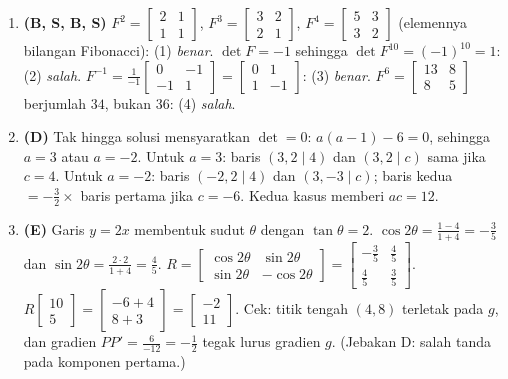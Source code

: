 \documentclass[a4paper,11pt]{article}
\newcommand{\sm}[1]{\left[\begin{smallmatrix}#1\end{smallmatrix}\right]}
\begin{document}
\begin{enumerate}[leftmargin=2em,itemsep=2pt,topsep=2pt]
\item[\textbf{10.}] \textbf{(B, S, B, S)} $F^2=\sm{2&1\\1&1}$, $F^3=\sm{3&2\\2&1}$, $F^4=\sm{5&3\\3&2}$ (elemennya bilangan Fibonacci): (1) \emph{benar}. $\det F=-1$ sehingga $\det F^{10}=(-1)^{10}=1$: (2) \emph{salah}. $F^{-1}=\frac{1}{-1}\sm{0&-1\\-1&1}=\sm{0&1\\1&-1}$: (3) \emph{benar}. $F^6=\sm{13&8\\8&5}$ berjumlah $34$, bukan $36$: (4) \emph{salah}.
\item[\textbf{11.}] \textbf{(D)} Tak hingga solusi mensyaratkan $\det=0$: $a(a-1)-6=0$, sehingga $a=3$ atau $a=-2$. Untuk $a=3$: baris $(3,2\mid4)$ dan $(3,2\mid c)$ sama jika $c=4$. Untuk $a=-2$: baris $(-2,2\mid4)$ dan $(3,-3\mid c)$; baris kedua $=-\tfrac32\times$ baris pertama jika $c=-6$. Kedua kasus memberi $ac=12$.
\item[\textbf{12.}] \textbf{(E)} Garis $y=2x$ membentuk sudut $\theta$ dengan $\tan\theta=2$. $\cos2\theta=\frac{1-4}{1+4}=-\frac35$ dan $\sin2\theta=\frac{2\cdot2}{1+4}=\frac45$. $R=\begin{bmatrix}\cos2\theta&\sin2\theta\\\sin2\theta&-\cos2\theta\end{bmatrix}=\begin{bmatrix}-\frac35&\frac45\\\frac45&\frac35\end{bmatrix}$. $R\begin{bmatrix}10\\5\end{bmatrix}=\begin{bmatrix}-6+4\\8+3\end{bmatrix}=\begin{bmatrix}-2\\11\end{bmatrix}$. Cek: titik tengah $(4,8)$ terletak pada $g$, dan gradien $PP'=\frac{6}{-12}=-\frac12$ tegak lurus gradien $g$. (Jebakan D: salah tanda pada komponen pertama.)

\end{enumerate}
\end{document}
